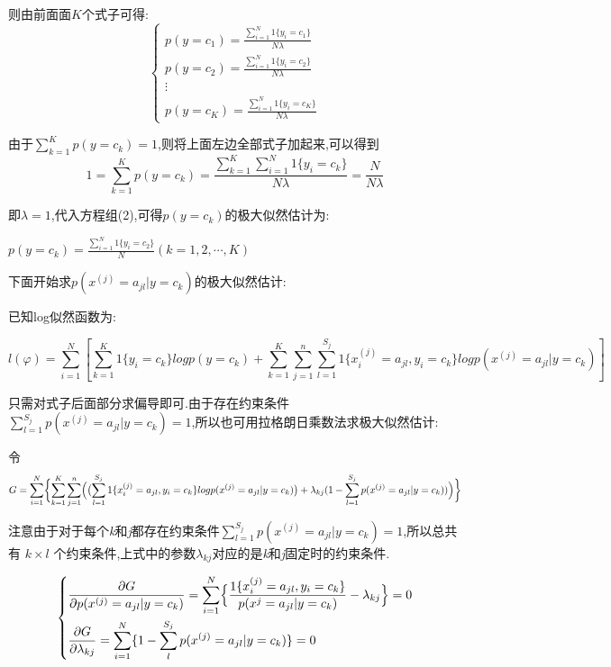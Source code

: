 \documentclass[UTF8]{ctexart}
\begin{document}
则由前面面$K$个式子可得:
\begin{equation}
  \begin{cases}
    p(y=c_{1})=\frac{\sum\limits^N_{i=1} 1\{y_i=c_{1}\}}{N\lambda} \\
    p(y=c_{2})=\frac{\sum\limits^N_{i=1} 1\{y_i=c_{2}\}}{N\lambda}\\
    \vdots\\
    p(y=c_{K})=\frac{\sum\limits^N_{i=1} 1\{y_i=c_{K}\}}{N\lambda}
    \end{cases}
\end{equation}

由于$\sum\limits^K_{k=1} p(y=c_k)=1$,则将上面左边全部式子加起来,可以得到
  $$1=\sum\limits^K_{k=1} p(y=c_k)=\frac{\sum\limits^{K}_{k=1} \sum\limits^{N}_{i=1} 1\{y_{i}=c_{k}\}}{N\lambda} =\frac{N}{N\lambda} $$

即$\lambda =1$,代入方程组(2),可得$p(y=c_k)$的极大似然估计为:

$p(y=c_k)= \frac{\sum\limits^N_{i=1} 1\{y_i=c_{2}\}}{N}(k=1,2,\cdots,K)$

下面开始求$p(x^{(j)}=a_{jl}|y=c_{k})$的极大似然估计:

已知log似然函数为:

$$
l(\varphi) =\sum^N_{i=1}[\sum^K_{k=1} 1\{y_i=c_k\}log p(y=c_k)+\sum^K_{k=1}\sum^n_{j=1} \sum^{S_j}_{l=1} 1\{x^{(j)}_i=a_{jl},y_i=c_k\} logp(x^{(j)}=a_{jl}|y=c_k)] $$

只需对式子后面部分求偏导即可.由于存在约束条件$\sum\limits^{S_j}_{l=1}p(x^{(j)}=a_{jl}|y=c_k)=1$,所以也可用拉格朗日乘数法求极大似然估计:

令$$G=\sum^N_{i=1} \biggl\{ \sum^K_{k=1} \sum^n_{j=1} \Bigl(  \bigl( \sum^{S_j}_{l=1} 1\{x^{(j)}_i=a_{jl},y_i=c_k\} logp(x^{(j)}=a_{jl}|y=c_k) \bigr) + \lambda_{kj} (1- \sum\limits^{S_j}_{l=1} p(x^{(j)}=a_{jl}|y=c_k)) \Bigr) \biggr\}$$

注意由于对于每个\textsl{k}和\textsl{j}都存在约束条件$\sum\limits^{S_j}_{l=1}p(x^{(j)}=a_{jl}|y=c_k)=1$,所以总共有 $k\times l $ 个约束条件,上式中的参数$\lambda_{kj}$对应的是\textsl{k}和\textsl{j}固定时的约束条件.

\begin{equation}
  \left\{ \begin{lgathered}
      \frac{\partial G}{\partial p(x^{(j)}=a_{jl}|y=c_k)} = \sum\limits^N_{i=1} \Bigl\{  \frac{ 1 \{ x^{(j)}_i=a_{jl},y_i=c_k \} }{ p( x^j = a_{jl} | y=c_k ) } - \lambda_{kj} \Bigr\}=0 \\
      \frac{\partial G}{\partial \lambda_{kj} }= \sum\limits^N_{i=1}  \{ 1 - \sum\limits^{S_j}_l p(x^{(j)} =a_{jl} | y=c_k ) \}=0 
      \end{lgathered} \right.
  \end{equation}
\end{document}
